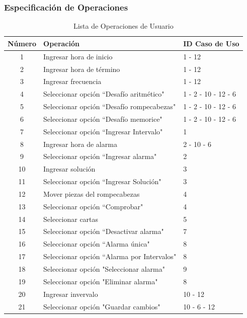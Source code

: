 \subsubsection{Especificación de Operaciones}
\begin{table}[H]
    \centering
    \caption{Lista de Operaciones de Usuario}
    \vspace{5pt}
    \begin{tabular}{| c | l | l |}
        \hline
        Número & Operación & ID Caso de Uso \\
        \hline
        1 & Ingresar hora de inicio & 1 - 12 \\
        \hline
        2 & Ingresar hora de término & 1 - 12 \\
        \hline
        3 & Ingresar frecuencia & 1 - 12 \\
        \hline
        4 & Seleccionar opción ``Desafío aritmético" & 1 - 2 - 10 - 12 - 6 \\
        \hline
        5 & Seleccionar opción ``Desafío rompecabezas" & 1 - 2 - 10 - 12 - 6 \\
        \hline
        6 & Seleccionar opción ``Desafío memorice" & 1 - 2 - 10 - 12 - 6 \\
        \hline
        7 & Seleccionar opción ``Ingresar Intervalo" & 1 \\
        \hline
        8 & Ingresar hora de alarma & 2 - 10 - 6 \\
        \hline
        9 & Seleccionar opción ``Ingresar alarma" & 2 \\
        \hline
        10 & Ingresar solución & 3 \\
        \hline
        11 & Seleccionar opción ``Ingresar Solución" & 3 \\
        \hline
        12 & Mover piezas del rompecabezas & 4 \\
        \hline
        13 & Seleccionar opción ``Comprobar" & 4 \\
        \hline
        14 & Seleccionar cartas & 5 \\
        \hline
        15 & Seleccionar opción ``Desactivar alarma" & 7 \\
        \hline
        16 & Seleccionar opción ``Alarma única" & 8 \\
        \hline
        17 & Seleccionar opción ``Alarma por Intervalos" & 8 \\
        \hline
        18 & Seleccionar opción "Seleccionar alarma" & 9 \\
        \hline
        19 & Seleccionar opción "Eliminar alarma" & 8 \\
        \hline
        20 & Ingresar invervalo & 10 - 12 \\
        \hline
        21 & Seleccionar opción "Guardar cambios" & 10 - 6 - 12 \\
        \hline
    \end{tabular}    
    
    \label{table:2}
\end{table}

